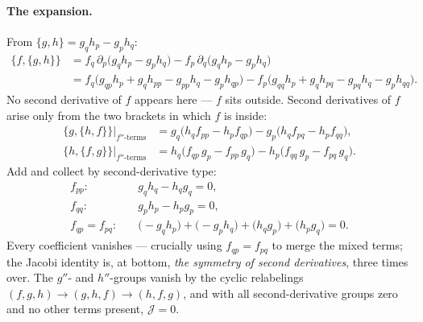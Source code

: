 \documentclass[11pt]{article}
\theoremstyle{plain}
\theoremstyle{definition}
\theoremstyle{remark}
\begin{document}
\paragraph{The expansion.}
From $\{g,h\} = g_q h_p - g_p h_q$:
\begin{align}
  \{f,\{g,h\}\}
  &= f_q\,\partial_p\bigl(g_qh_p - g_ph_q\bigr)
   - f_p\,\partial_q\bigl(g_qh_p - g_ph_q\bigr) \nonumber\\
  &= f_q\bigl(g_{qp}h_p + g_qh_{pp} - g_{pp}h_q - g_ph_{qp}\bigr)
   - f_p\bigl(g_{qq}h_p + g_qh_{pq} - g_{pq}h_q - g_ph_{qq}\bigr) .
\end{align}
No second derivative of $f$ appears here --- $f$ sits outside. Second
derivatives of $f$ arise only from the two brackets in which $f$ is
inside:
\begin{align}
  \{g,\{h,f\}\}\Big|_{f''\text{-terms}}
  &= g_q\bigl(h_q f_{pp} - h_p f_{qp}\bigr)
   - g_p\bigl(h_q f_{pq} - h_p f_{qq}\bigr) ,\\
  \{h,\{f,g\}\}\Big|_{f''\text{-terms}}
  &= h_q\bigl(f_{qp}\,g_p - f_{pp}\,g_q\bigr)
   - h_p\bigl(f_{qq}\,g_p - f_{pq}\,g_q\bigr) .
\end{align}
Add and collect by second-derivative type:
\begin{align}
  f_{pp}:&\quad g_q h_q - h_q g_q = 0, \nonumber\\
  f_{qq}:&\quad g_p h_p - h_p g_p = 0, \nonumber\\
  f_{qp} = f_{pq}:&\quad
  \bigl(-g_q h_p\bigr) + \bigl(-g_p h_q\bigr)
  + \bigl(h_q g_p\bigr) + \bigl(h_p g_q\bigr) = 0 .
\end{align}
Every coefficient vanishes --- crucially using $f_{qp} = f_{pq}$ to merge
the mixed terms; the Jacobi identity is, at bottom, \emph{the symmetry of
second derivatives}, three times over. The $g''$- and $h''$-groups vanish
by the cyclic relabelings $(f,g,h) \to (g,h,f) \to (h,f,g)$, and with all
second-derivative groups zero and no other terms present,
$\mathcal J = 0$.
\end{document}
